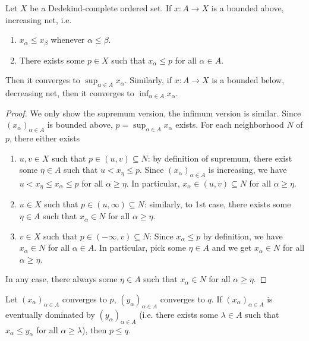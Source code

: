 \documentclass{treatise}
\begin{document}
\begin{theorem} \label{topo-ord-mono-conv}
Let $X$ be a Dedekind-complete ordered set. If $x: A \to X$ is a bounded above, increasing net, i.e.
\begin{enumerate}
    \item $x_\alpha \leq x_\beta$ whenever $\alpha \leq \beta$.
    \item There exists some $p \in X$ such that $x_\alpha \leq p$ for all $\alpha \in A$.
\end{enumerate}
Then it converges to $\sup_{\alpha \in A} x_\alpha$. Similarly, if $x: A \to X$ is a bounded below, decreasing net, then it converges to $\inf_{\alpha \in A} x_\alpha$.
\end{theorem}
\begin{proof}
We only show the supremum version, the infimum version is similar. Since $(x_\alpha)_{\alpha \in A}$ is bounded above, $p = \sup_{\alpha \in A} x_\alpha$ exists. For each neighborhood $N$ of $p$, there either exists
\begin{enumerate}
    \item $u, v \in X$ such that $p \in (u, v) \subseteq N$: by definition of supremum, there exist some $\eta \in A$ such that $u < x_\eta \leq p$. Since $(x_\alpha)_{\alpha \in A}$ is increasing, we have $u < x_\eta \leq x_\alpha \leq p$ for all $\alpha \geq \eta$. In particular, $x_\alpha \in (u, v) \subseteq N$ for all $\alpha \geq \eta$.
    \item $u \in X$ such that $p \in (u, \infty) \subseteq N$: similarly, to 1st case, there exists some $\eta \in A$ such that $x_\alpha \in N$ for all $\alpha \geq \eta$.
    \item $v \in X$ such that $p \in (-\infty, v) \subseteq N$: Since $x_\alpha \leq p$ by definition, we have $x_\alpha \in N$ for all $\alpha \in A$. In particular, pick some $\eta \in A$ and we get $x_\alpha \in N$ for all $\alpha \geq \eta$.
\end{enumerate}
In any case, there always some $\eta \in A$ such that $x_\alpha \in N$ for all $\alpha \geq \eta$.
\end{proof}
\begin{proposition}[Monotonicity] \label{topo-ord-dom-monic}
Let $(x_\alpha)_{\alpha \in A}$ converges to $p$, $(y_\alpha)_{\alpha \in A}$ converges to $q$. If $(x_\alpha)_{\alpha \in A}$ is eventually dominated by $(y_\alpha)_{\alpha \in A}$ (i.e. there exists some $\lambda \in A$ such that $x_\alpha \leq y_\alpha$ for all $\alpha \geq \lambda$), then $p \leq q$.
\end{proposition}
\end{document}
